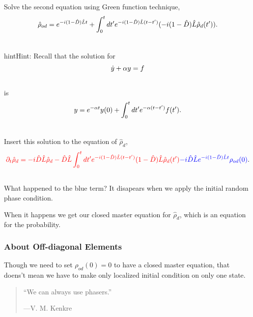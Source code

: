 \documentclass[letterpaper,10pt,english]{sphinxmanual}
\begin{document}
Solve the second equation using Green function technique,
\begin{gather}
\begin{split}\hat \rho_{od} = e^{-i(1-\hat D)\hat L t} + \int_0^t dt' e^{-i(1-\hat D) \hat L (t-t')}(-i(1-\hat D)\hat L \hat \rho_d(t')) .\end{split}\notag\\\begin{split}\end{split}\notag
\end{gather}
\begin{notice}{hint}{Hint:}
Recall that the solution for
\begin{gather}
\begin{split}\dot y + \alpha y = f\end{split}\notag\\\begin{split}\end{split}\notag
\end{gather}
is
\begin{gather}
\begin{split}y = e^{-\alpha t} y(0) + \int_0^t dt' e^{-\alpha (t-t')} f(t') .\end{split}\notag\\\begin{split}\end{split}\notag
\end{gather}\end{notice}

Insert this solution to the equation of $\hat \rho_d$,
\begin{gather}
\begin{split}{\color{red}\partial_t \hat \rho_d = - i\hat D\hat L \hat \rho_d -  \hat D\hat L \int_0^t dt' e^{-i(1-\hat D) \hat L (t-t')}(1-\hat D)\hat L \hat \rho_d(t')} {\color{blue} - i \hat D \hat L e^{-i(1-\hat D)\hat L t} \rho_{od}(0) }.\end{split}\notag\\\begin{split}\end{split}\notag
\end{gather}
What happened to the blue term? It disapears when we apply the initial random phase condition.

When it happens we get our closed master equation for $\hat \rho_d$, which is an equation for the probability.


\subsubsection{About Off-diagonal Elements}
\label{nonequilibrium/quantumMasterEqn:about-off-diagonal-elements}
Though we need to set $\rho_{od}(0)=0$ to have a closed master equation, that doens't mean we have to make only localized initial condition on only one state.
\begin{quote}

``We can always use phasers.''

\begin{flushright}
---V. M. Kenkre
\end{flushright}
\end{quote}
\end{document}
